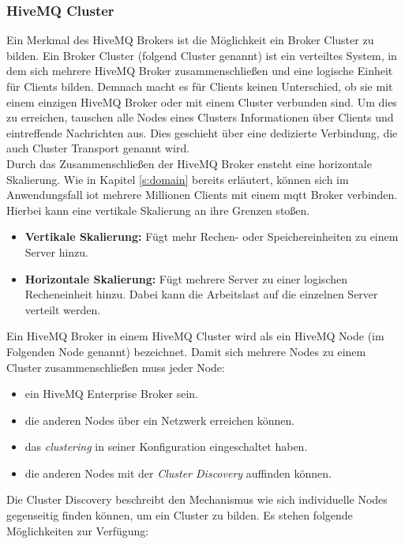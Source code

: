 \subsubsection{HiveMQ Cluster} \label{s:hivemq-cluster}
Ein Merkmal des HiveMQ Brokers ist die Möglichkeit ein Broker Cluster zu bilden.
Ein Broker Cluster (folgend Cluster genannt) ist ein verteiltes System, in dem sich mehrere HiveMQ Broker zusammenschlie{\ss}en und eine logische Einheit für Clients bilden.
Demnach macht es für Clients keinen Unterschied, ob sie mit einem einzigen HiveMQ Broker oder mit einem Cluster verbunden sind.
Um dies zu erreichen, tauschen alle Nodes eines Clusters Informationen über Clients und eintreffende Nachrichten aus. Dies geschieht über eine dedizierte Verbindung, die auch Cluster Transport genannt wird.
\cite{HiveMQClusterHiveMQ}
\\
Durch das Zusammenschlie{\ss}en der HiveMQ Broker ensteht eine horizontale Skalierung. Wie in Kapitel \ref{s:domain} bereits erläutert, können sich im Anwendungsfall \ac{iot} mehrere Millionen Clients mit einem \ac{mqtt} Broker verbinden. Hierbei kann eine vertikale Skalierung an ihre Grenzen sto{\ss}en.
\begin{itemize}
    \item \textbf{Vertikale Skalierung:} Fügt mehr Rechen- oder Speichereinheiten zu einem Server hinzu.
      \cite{HowScaleIT}
    \item \textbf{Horizontale Skalierung:} Fügt mehrere Server zu einer logischen Recheneinheit hinzu. Dabei kann die Arbeitslast auf die einzelnen Server verteilt werden.
      \cite{HowScaleIT}
\end{itemize}
Ein HiveMQ Broker in einem HiveMQ Cluster wird als ein HiveMQ Node (im Folgenden Node genannt) bezeichnet.
Damit sich mehrere Nodes zu einem Cluster zusammenschlie{\ss}en muss jeder Node:
\begin{itemize}
    \item ein HiveMQ Enterprise Broker sein.
    \item die anderen Nodes über ein Netzwerk erreichen können.
    \item das \textit{clustering} in seiner Konfiguration eingeschaltet haben.
    \item die anderen Nodes mit der \textit{Cluster Discovery} auffinden können.
\end{itemize}
Die Cluster Discovery beschreibt den Mechanismus wie sich individuelle Nodes gegenseitig finden können, um ein Cluster zu bilden. Es stehen folgende Möglichkeiten zur Verfügung:
